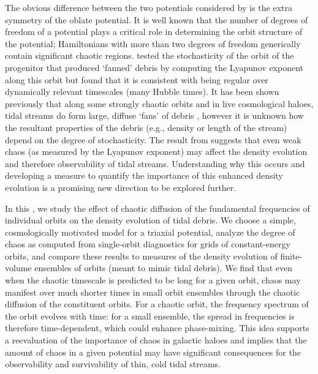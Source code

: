 The obvious difference between the two potentials considered by
\citet{pearson15} is the extra symmetry of the oblate potential. It is well
known that the number of degrees of freedom of a potential plays a critical role
in determining the orbit structure of the potential; Hamiltonians with more than
two degrees of freedom generically contain significant chaotic regions.
\citet{pearson15} tested the stochasticity of the orbit of the progenitor that
produced `fanned' debris by computing the Lyapunov exponent along this orbit but
found that it is consistent with being regular over dynamically relevant
timescales (many Hubble times). It has been shown previously that along some
strongly chaotic orbits and in live cosmological haloes, tidal streams do form
large, diffuse `fans' of debris \citep[e.g.,][]{fardal14, ngan15}, however it is
unknown how the resultant properties of the debris (e.g., density or length of
the stream) depend on the degree of stochasticity. The result from
\citet{pearson15} suggests that even weak chaos (as measured by the Lyapunov
exponent) may affect the density evolution and therefore observability of tidal
streams. Understanding why this occurs and developing a measure to quantify the
importance of this enhanced density evolution is a promising new direction to be
explored further.

In this \article, we study the effect of chaotic diffusion of the
fundamental frequencies of individual orbits on the density evolution of tidal
debris. We choose a simple, cosmologically motivated model for a triaxial
potential, analyze the degree of chaos as computed from single-orbit diagnostics
for grids of constant-energy orbits, and compare these results to measures of
the density evolution of finite-volume ensembles of orbits (meant to mimic tidal
debris). We find that even when the chaotic timescale is predicted to be long
for a given orbit, chaos may manifest over much shorter times in small orbit
ensembles through the chaotic diffusion of the constituent orbits. For a chaotic
orbit, the frequency spectrum of the orbit evolves with time: for a small
ensemble, the spread in frequencies is therefore time-dependent, which could
enhance phase-mixing. This idea supports a reevaluation of the importance of
chaos in galactic haloes and implies that the amount of chaos in a given
potential may have significant consequences for the observability and
survivability of thin, cold tidal streams.

